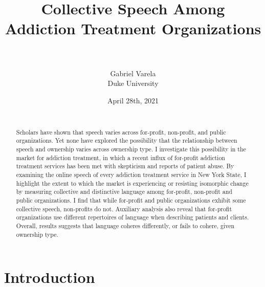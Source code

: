 \documentclass[
  12pt,
]{article}
\title{\vspace{1cm}Collective Speech Among Addiction Treatment Organizations\\
~\\}
\author{Gabriel Varela\\
Duke University}
\date{April 28th, 2021\\
~\\}
\begin{document}
\maketitle
\begin{abstract}
\noindent{}Scholars have shown that speech varies across for-profit, non-profit, and public organizations. Yet none have explored the possibility that the relationship between speech and ownership varies across ownership type. I investigate this possibility in the market for addiction treatment, in which a recent influx of for-profit addiction treatment services has been met with skepticism and reports of patient abuse. By examining the online speech of every addiction treatment service in New York State, I highlight the extent to which the market is experiencing or resisting isomorphic change by measuring collective and distinctive language among for-profit, non-profit and public organizations. I find that while for-profit and public organizations exhibit some collective speech, non-profits do not. Auxiliary analysis also reveal that for-profit organizations use different repertoires of language when describing patients and clients. Overall, results suggests that language coheres differently, or fails to cohere, given ownership type. \vspace{.8cm}
\end{abstract}

\clearpage

\hypertarget{introduction}{%
\section{Introduction}\label{introduction}}
\end{document}
